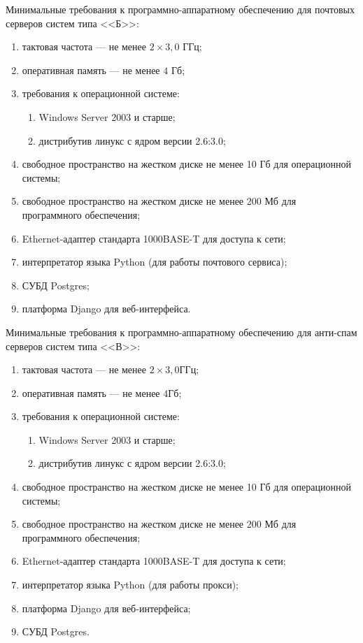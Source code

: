 Минимальные требования к программно-аппаратному обеспечению для почтовых серверов систем типа <<Б>>:

\begin{enumerate}
	\item тактовая частота  --- не менее $2\times3,0$ ГГц; 
	\item оперативная память --- не менее $4$ Гб;
	\item требования к операционной системе:
	\begin{enumerate}
		\item Windows Server 2003 и старше;
		\item дистрибутив линукс с ядром версии 2.6:3.0;
	\end{enumerate}
	\item свободное пространство на жестком диске не менее 10 Гб для операционной системы;
	\item свободное пространство на жестком диске не менее 200 Мб для программного обеспечения;
	\item Ethernet-адаптер стандарта 1000BASE-T для доступа к сети;
	\item интерпретатор языка Python (для работы почтового сервиса);
	\item СУБД Postgres;	
	\item платформа Django для веб-интерфейса.
\end{enumerate}

Минимальные требования к программно-аппаратному обеспечению для анти-спам серверов систем типа <<В>>:

\begin{enumerate}
	\item тактовая частота  --- не менее $2\times3,0 \text{ГГц}$; 
	\item оперативная память --- не менее $4 \text{Гб}$;
	\item требования к операционной системе:
	\begin{enumerate}
		\item Windows Server 2003 и старше;
		\item дистрибутив линукс с ядром версии 2.6:3.0;
	\end{enumerate}
	\item свободное пространство на жестком диске не менее 10 Гб для операционной системы;
	\item свободное пространство на жестком диске не менее 200 Мб для программного обеспечения;
	\item Ethernet-адаптер стандарта 1000BASE-T для доступа к сети;
	\item интерпретатор языка Python (для работы прокси);
	\item платформа Django для веб-интерфейса;
	\item СУБД Postgres.
\end{enumerate}

